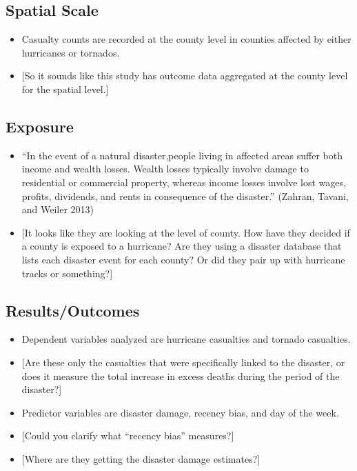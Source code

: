 \documentclass[
]{article}
\providecommand{\tightlist}{%
  \setlength{\itemsep}{0pt}\setlength{\parskip}{0pt}}
\begin{document}
\hypertarget{spatial-scale-18}{%
\subsection{Spatial Scale}\label{spatial-scale-18}}

\begin{itemize}
\tightlist
\item
  Casualty counts are recorded at the county level in counties affected
  by either hurricanes or tornados.
\item
  {[}So it sounds like this study has outcome data aggregated at the
  county level for the spatial level.{]}
\end{itemize}

\hypertarget{exposure-17}{%
\subsection{Exposure}\label{exposure-17}}

\begin{itemize}
\tightlist
\item
  ``In the event of a natural disaster,people living in affected areas
  suffer both income and wealth losses. Wealth losses typically involve
  damage to residential or commercial property, whereas income losses
  involve lost wages, profits, dividends, and rents in consequence of
  the disaster.'' (Zahran, Tavani, and Weiler 2013)
\item
  {[}It looks like they are looking at the level of county. How have
  they decided if a county is exposed to a hurricane? Are they using a
  disaster database that lists each disaster event for each county? Or
  did they pair up with hurricane tracks or something?{]}
\end{itemize}

\hypertarget{resultsoutcomes-13}{%
\subsection{Results/Outcomes}\label{resultsoutcomes-13}}

\begin{itemize}
\tightlist
\item
  Dependent variables analyzed are hurricane casualties and tornado
  casualties.
\item
  {[}Are these only the casualties that were specifically linked to the
  disaster, or does it measure the total increase in excess deaths
  during the period of the disaster?{]}
\item
  Predictor variables are disaster damage, recency bias, and day of the
  week.
\item
  {[}Could you clarify what ``recency bias'' measures?{]}
\item
  {[}Where are they getting the disaster damage estimates?{]}
\end{itemize}
\end{document}
